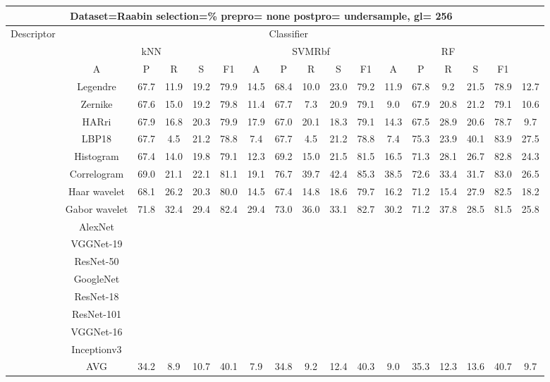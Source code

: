 \documentclass[12pt,italian]{article}
\begin{document}
\begin{tiny}
\begin{longtable}{lcccccccccccccccc}
\toprule
\multicolumn{16}{c}{Dataset=Raabin selection=\% prepro= none postpro= undersample, gl= 256} \\ 
\toprule
Descriptor & \multicolumn{15}{c}{Classifier} \\ 
& \multicolumn{5}{c}{kNN} & \multicolumn{5}{c}{SVMRbf} & \multicolumn{5}{c}{RF} \\ 
& A & P & R & S & F1 & A & P & R & S & F1 & A & P & R & S & F1 \\ 
\midrule
& Legendre & 67.7 & 11.9 & 19.2 & 79.9 & 14.5 & 68.4 & 10.0 & 23.0 & 79.2 & 11.9 & 67.8 &  9.2 & 21.5 & 78.9 & 12.7 \\ 
& Zernike & 67.6 & 15.0 & 19.2 & 79.8 & 11.4 & 67.7 &  7.3 & 20.9 & 79.1 &  9.0 & 67.9 & 20.8 & 21.2 & 79.1 & 10.6 \\ 
& HARri & 67.9 & 16.8 & 20.3 & 79.9 & 17.9 & 67.0 & 20.1 & 18.3 & 79.1 & 14.3 & 67.5 & 28.9 & 20.6 & 78.7 &  9.7 \\ 
& LBP18 & 67.7 &  4.5 & 21.2 & 78.8 &  7.4 & 67.7 &  4.5 & 21.2 & 78.8 &  7.4 & 75.3 & 23.9 & 40.1 & 83.9 & 27.5 \\ 
& Histogram & 67.4 & 14.0 & 19.8 & 79.1 & 12.3 & 69.2 & 15.0 & 21.5 & 81.5 & 16.5 & 71.3 & 28.1 & 26.7 & 82.8 & 24.3 \\ 
& Correlogram & 69.0 & 21.1 & 22.1 & 81.1 & 19.1 & 76.7 & 39.7 & 42.4 & 85.3 & 38.5 & 72.6 & 33.4 & 31.7 & 83.0 & 26.5 \\ 
& Haar wavelet & 68.1 & 26.2 & 20.3 & 80.0 & 14.5 & 67.4 & 14.8 & 18.6 & 79.7 & 16.2 & 71.2 & 15.4 & 27.9 & 82.5 & 18.2 \\ 
& Gabor wavelet & 71.8 & 32.4 & 29.4 & 82.4 & 29.4 & 73.0 & 36.0 & 33.1 & 82.7 & 30.2 & 71.2 & 37.8 & 28.5 & 81.5 & 25.8 \\ 
& AlexNet \\ 
& VGGNet-19 \\ 
& ResNet-50 \\ 
& GoogleNet \\ 
& ResNet-18 \\ 
& ResNet-101 \\ 
& VGGNet-16 \\ 
& Inceptionv3 \\ 
\hline
& AVG & 34.2 &  8.9 & 10.7 & 40.1 &  7.9 & 34.8 &  9.2 & 12.4 & 40.3 &  9.0 & 35.3 & 12.3 & 13.6 & 40.7 &  9.7 \\ 
\hline
\bottomrule
\end{longtable} 


\end{tiny}
\end{document}
